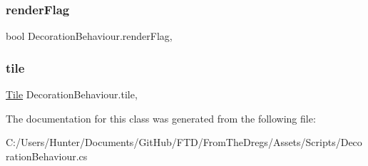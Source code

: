 \mbox{\label{class_decoration_behaviour_a683b77b56bcac3f59bde61021b1592c0}} 
\subsubsection{\texorpdfstring{renderFlag}{renderFlag}}
{\footnotesize\ttfamily bool Decoration\+Behaviour.\+render\+Flag\hspace{0.3cm}{\ttfamily [get]}, {\ttfamily [set]}}

\mbox{\label{class_decoration_behaviour_ae1f553f396cbb145d7e5c8724c0d24a0}} 
\subsubsection{\texorpdfstring{tile}{tile}}
{\footnotesize\ttfamily \mbox{\hyperlink{class_tile}{Tile}} Decoration\+Behaviour.\+tile\hspace{0.3cm}{\ttfamily [get]}, {\ttfamily [set]}}



The documentation for this class was generated from the following file\+:\begin{DoxyCompactItemize}
\item 
C\+:/\+Users/\+Hunter/\+Documents/\+Git\+Hub/\+F\+T\+D/\+From\+The\+Dregs/\+Assets/\+Scripts/Decoration\+Behaviour.\+cs\end{DoxyCompactItemize}
